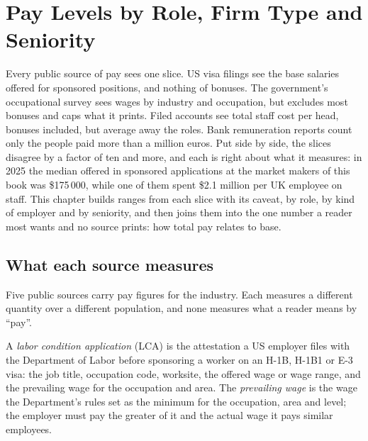 \chapter{Pay Levels by Role, Firm Type and Seniority}\label{ch:in:pay-levels-by-role-firm-type-and-seniority}

Every public source of pay sees one slice. US visa filings see the base salaries offered for sponsored positions, and
nothing of bonuses. The government's occupational survey sees wages by industry and occupation, but excludes most
bonuses and caps what it prints. Filed accounts see total staff cost per head, bonuses included, but average away the
roles. Bank remuneration reports count only the people paid more than a million euros. Put side by side, the slices
disagree by a factor of ten and more, and each is right about what it measures: in 2025 the median  offered
in sponsored applications at the market makers of this book was \$175\,000, while one of them spent \$2.1 million per
UK employee on staff. This chapter builds ranges from each slice with its caveat, by role, by kind of employer and by
seniority, and then joins them into the one number a reader most wants and no source prints: how total pay relates to
base.

\section{What each source measures}

Five public sources carry pay figures for the industry. Each measures a different quantity over a different population,
and none measures what a reader means by ``pay''.

\begin{definition}\label{def:in:pay-levels-by-role-firm-type-and-seniority:lca}
A \emph{labor condition application} (LCA) is the attestation a US employer files
with the Department of Labor before sponsoring a worker on an H-1B, H-1B1 or E-3 visa: the job title, occupation code,
worksite, the offered wage or wage range, and the prevailing wage for the occupation and area. The \emph{prevailing
wage} is the wage the Department's rules set as the minimum for the occupation, area and level;
the employer must pay the greater of it and the actual wage it pays similar employees.
\end{definition}

